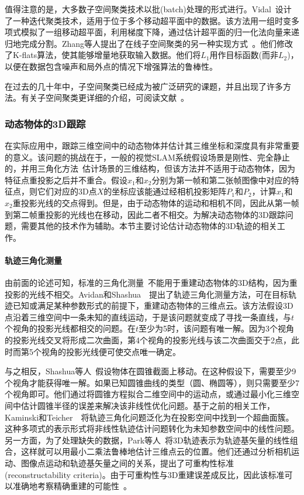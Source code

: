 值得注意的是，大多数子空间聚类技术以批(batch)处理的形式进行。Vidal~\cite{vidal2007online}设计了一种迭代聚类技术，适用于位于多个移动超平面中的数据。该方法用一组时变多项式模拟了一组移动超平面，利用梯度下降，通过估计超平面的归一化法向量来递归地完成分割。Zhang等人提出了在线子空间聚类的另一种实现方式~\cite{zhang2009median}。他们修改了K-flats算法，使其能够增量地获取输入数据。他们将$L_1$用作目标函数(而非$L_2$)，以便在数据包含噪声和局外点的情况下增强算法的鲁棒性。

在过去的几十年中，子空间聚类已经成为被广泛研究的课题，并且出现了许多方法。有关子空间聚类更详细的介绍，可阅读文献~\cite{vidal2011subspace}。

\subsubsection{动态物体的3D跟踪}
在实际应用中，跟踪三维空间中的动态物体并估计其三维坐标和深度具有非常重要的意义。该问题的挑战在于，一般的视觉SLAM系统假设场景是刚性、完全静止的，并用三角化方法~\cite{hartley1997triangulation}估计场景的三维结构，但该方法并不适用于动态物体，因为特征点重投影之后并不重合。假设$x_1$和$x_2$分别为第一帧和第二张帧图像中对应的特征点，则它们对应的3D点$X$的坐标应该能通过经相机投影矩阵$P_1$和$P_2$，计算$x_1$和$x_2$重投影光线的交点得到。但是，由于动态物体的运动和相机不同，因此从第一帧到第二帧重投影的光线也在移动，因此二者不相交。为解决动态物体的3D跟踪问题，需要其他的技术作为辅助。本节主要讨论估计动态物体的3D轨迹的相关工作。

\paragraph{轨迹三角化测量}
由前面的论述可知，标准的三角化测量~\cite{hartley1997triangulation}不能用于重建动态物体的3D结构，因为重投影的光线不相交。Avidan和Shashua~\cite{avidan1999trajectory}~\cite{avidan2000trajectory}提出了轨迹三角化测量方法，可在目标轨迹已知或满足某种参数形式的前提下，重建动态物体的三维点云。该方法假设3D点沿着三维空间中一条未知的直线运动，于是该问题就变成了寻找一条直线，与$t$个视角的投影光线都相交的问题。在$t$至少为5时，该问题有唯一解。因为3个视角的投影光线交叉将形成二次曲面，第4个视角的投影光线与该二次曲面交于2点，此时而第5个视角的投影光线便可使交点唯一确定。

与之相反，Shashua等人~\cite{shashua1999trajectory}假设物体在圆锥截面上移动。在这种假设下，需要至少9个视角才能获得唯一解。如果已知圆锥曲线的类型（圆、椭圆等），则只需要至少7个视角即可。他们通过将圆锥方程拟合二维空间中的运动点，或通过最小化三维空间中估计圆锥半径的误差来解决该非线性优化问题。基于之前的相关工作，Kaminski和Teicher~\cite{kaminski2002general}~\cite{kaminski2004general}将轨迹三角化问题泛化为在投影空间中找到一个超曲面簇。这种多项式的表示形式将非线性轨迹估计问题转化为未知参数空间中的线性问题。另一方面，为了处理缺失的数据，Park等人~\cite{park20103d}将3D轨迹表示为轨迹基矢量的线性组合，这样就可以用最小二乘法鲁棒地估计三维点云的位置。他们还通过分析相机运动、图像点运动和轨迹基矢量之间的关系，提出了可重构性标准(reconstructability criteria)。由于可重构性与3D重建误差成反比，因此该标准可以准确地考察精确重建的可能性~\cite{park20153d}。

